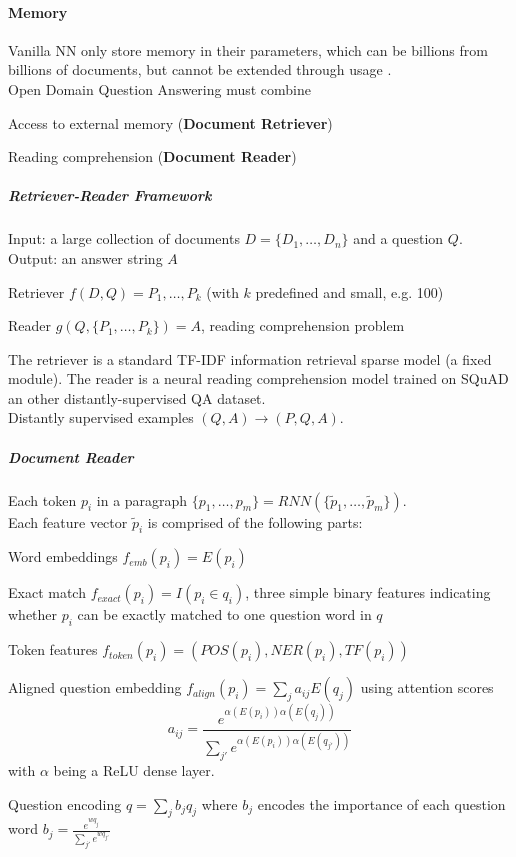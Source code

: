 \documentclass[10pt]{report}
\begin{document}
\paragraph{Memory} Vanilla NN only store memory in their parameters, which can be billions from billions of documents, but cannot be extended through usage
.\\
Open Domain Question Answering must combine\begin{list}{}{}
	\item Access to external memory (\textbf{Document Retriever})
	\item Reading comprehension (\textbf{Document Reader})
\end{list}
\subparagraph{Retriever-Reader Framework} Input: a large collection of documents $D = \{D_1,\ldots,D_n\}$ and a question $Q$.\\
Output: an answer string $A$
\begin{list}{}{}
	\item Retriever $f(D,Q) = P_1,\ldots,P_k$ (with $k$ predefined and small, e.g. 100)
	\item Reader $g(Q, \{P_1,\ldots,P_k\}) = A$, reading comprehension problem
\end{list}
The retriever is a standard TF-IDF information retrieval sparse model (a fixed module). The reader is a neural reading comprehension model trained on SQuAD an other distantly-supervised QA dataset.\\
Distantly supervised examples $(Q,A)\rightarrow (P,Q,A)$.
\subparagraph{Document Reader} Each token $p_i$ in a paragraph $\{p_1,\ldots,p_m\}=RNN(\{\tilde{p}_1,\ldots,\tilde{p}_m\})$.\\
Each feature vector $\tilde{p}_i$ is comprised of the following parts:
\begin{list}{}{}
	\item Word embeddings $f_{emb}(p_i) = E(p_i)$
	\item Exact match $f_{exact}(p_i) = I(p_i \in q_i)$, three simple binary features indicating whether $p_i$ can be exactly matched to one question word in $q$
	\item Token features $f_{token}(p_i) = (POS(p_i), NER(p_i), TF(p_i))$
	\item Aligned question embedding $f_{align}(p_i) = \sum_j a_{ij}E(q_j)$ using attention scores $$a_{ij}=\frac{e^{\alpha(E(p_i))\alpha(E(q_j))}}{\sum_{j'}e^{\alpha(E(p_i))\alpha(E(q_{j'}))}}$$ with $\alpha$ being a ReLU dense layer.
\end{list}
Question encoding $q=\sum_jb_jq_j$ where $b_j$ encodes the importance of each question word $b_j=\frac{e^{wq_j}}{\sum_{j'} e^{wq_{j'}}}$\\
\end{document}
